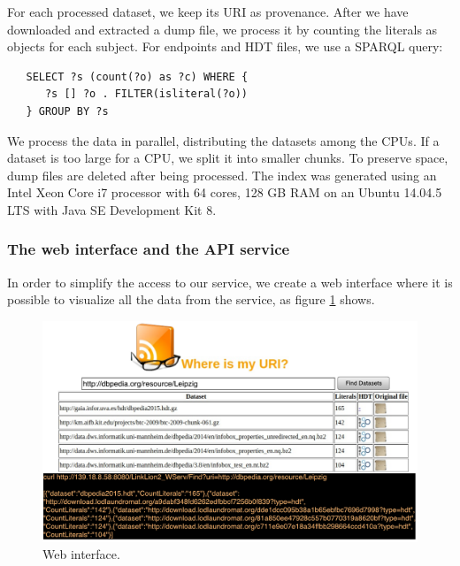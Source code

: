 For each processed dataset, we keep its URI as provenance.
After we have downloaded and extracted a dump file, we process it by counting the literals as objects for each subject.
For endpoints and HDT files, we use a SPARQL query:

\begin{verbatim}
   SELECT ?s (count(?o) as ?c) WHERE {
      ?s [] ?o . FILTER(isliteral(?o))  
   } GROUP BY ?s
\end{verbatim}

We process the data in parallel, distributing the datasets among the CPUs. 
If a dataset is too large for a CPU, we split it into smaller chunks.
To preserve space, dump files are deleted after being processed.
The index was generated using an Intel Xeon Core i7 processor with 64 cores, 128 GB RAM on an Ubuntu 14.04.5 LTS with Java SE Development Kit 8. %

\subsubsection{The web interface and the API service}

In order to simplify the access to our service, we create a web interface where it is possible to visualize all the data from the service, as figure \ref{fig:web} shows. 

\begin{figure}[htb] 
	\centering
	\includegraphics[width=350pt]{img/web.pdf}
	\caption{Web interface.}
	\label{fig:web}
\end{figure}

